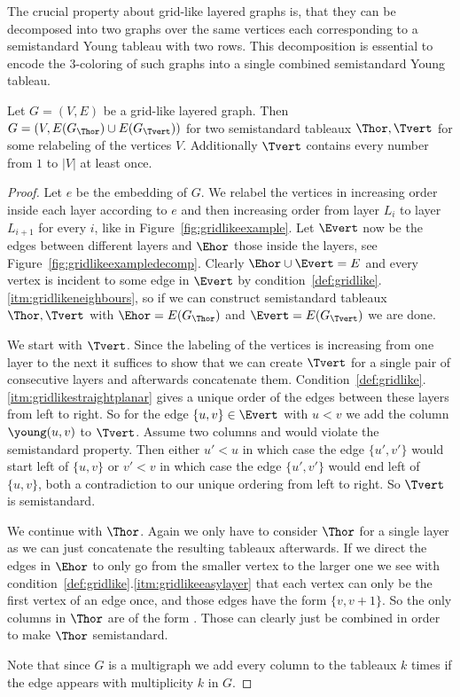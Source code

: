 The crucial property about grid-like layered graphs is, that they can be decomposed into two graphs over the same vertices each corresponding to a semistandard Young tableau with two rows.
This decomposition is essential to encode the $3$-coloring of such graphs into a single combined semistandard Young tableau.
\begin{lemma}
    \label{lem:gridlikedecomp}
    Let $G = (V, E)$ be a grid-like layered graph.
    Then $G = (V, E(G_{\Thor}) \cup E(G_{\Tvert}))$ for two semistandard tableaux $\Thor, \Tvert$ for some relabeling of the vertices $V$.
    Additionally $\Tvert$ contains every number from $1$ to $|V|$ at least once.
\end{lemma}
\begin{proof}
    Let $e$ be the embedding of $G$.
    We relabel the vertices in increasing order inside each layer according to $e$ and then increasing order from layer $L_i$ to layer $L_{i+1}$ for every $i$, like in Figure~\ref{fig:gridlikeexample}.
    Let $\Evert$ now be the edges between different layers and $\Ehor$ those inside the layers, see Figure~\ref{fig:gridlikeexampledecomp}.
    Clearly $\Ehor \cup \Evert = E$ and every vertex is incident to some edge in $\Evert$ by condition~\ref{def:gridlike}.\ref{itm:gridlikeneighbours}, so if we can construct semistandard tableaux $\Thor, \Tvert$ with $\Ehor = E(G_{\Thor})$ and $\Evert = E(G_{\Tvert})$ we are done.

    We start with $\Tvert$.
    Since the labeling of the vertices is increasing from one layer to the next it suffices to show that we can create $\Tvert$ for a single pair of consecutive layers and afterwards concatenate them.
    Condition~\ref{def:gridlike}.\ref{itm:gridlikestraightplanar} gives a unique order of the edges between these layers from left to right.
    So for the edge $\{u, v\} \in \Evert$ with $u < v$ we add the column {\scriptsize $\young(u,v)$} to $\Tvert$.
    Assume two columns
    {\scriptsize
{}}
    and
    {\scriptsize
{}}
would violate the semistandard property.
    Then either $u' < u$ in which case the edge $\{u', v'\}$ would start left of $\{u, v\}$ or $v' < v$ in which case the edge $\{u', v'\}$ would end left of $\{u, v\}$, both a contradiction to our unique ordering from left to right.
    So $\Tvert$ is semistandard.

    We continue with $\Thor$.
    Again we only have to consider $\Thor$ for a single layer as we can just concatenate the resulting tableaux afterwards.
    If we direct the edges in $\Ehor$ to only go from the smaller vertex to the larger one we see with condition~\ref{def:gridlike}.\ref{itm:gridlikeeasylayer} that each vertex can only be the first vertex of an edge once, and those edges have the form $\{v, v+1\}$.
    So the only columns in $\Thor$ are of the form
{\scriptsize
{}}.
    Those can clearly just be combined in order to make $\Thor$ semistandard.

    Note that since $G$ is a multigraph we add every column to the tableaux $k$ times if the edge appears with multiplicity $k$ in $G$.
\end{proof}
